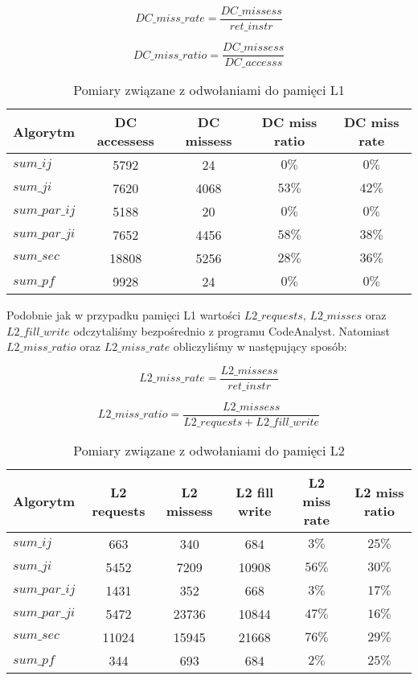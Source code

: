 \begin{equation}
  DC\_miss\_rate = \frac{DC\_missess}{ret\_instr}
\end{equation}

\begin{equation}
  DC\_miss\_ratio = \frac{DC\_missess}{DC\_accesss}
\end{equation}

\begin{table}[H]
\centering
\begin{tabular}{|l|c|c|c|c|}
\hline
Algorytm & DC accessess & DC missess & DC miss ratio & DC miss rate \\ \hline
$sum\_ij$ & 5792 & 24 & $0\%$ & $0\%$ \\ \hline
$sum\_ji$ & 7620 & 4068 & $53\%$ & $42\%$ \\ \hline
$sum\_par\_ij$ & 5188 & 20 & $0\%$ & $0\%$ \\ \hline
$sum\_par\_ji$ & 7652 & 4456 & $58\%$ & $38\%$ \\ \hline
$sum\_sec$ & 18808 & 5256 & $28\%$ & $36\%$ \\ \hline
$sum\_pf$ & 9928 & 24 & $0\%$ & $0\%$ \\ \hline
\end{tabular}
\caption{Pomiary związane z odwołaniami do pamięci L1}
\end{table}

Podobnie jak w przypadku pamięci L1 wartości $L2\_requests$, $L2\_misses$ oraz $L2\_fill\_write$ odczytaliśmy bezpośrednio z programu CodeAnalyst. Natomiast $L2\_miss\_ratio$ oraz $L2\_miss\_rate$ obliczyliśmy w następujący sposób:

\begin{equation}
  L2\_miss\_rate = \frac{L2\_missess}{ret\_instr}
\end{equation}

\begin{equation}
  L2\_miss\_ratio = \frac{L2\_missess}{L2\_requests + L2\_fill\_write}
\end{equation}

\begin{table}[H]
\centering
\begin{tabular}{|l|c|c|c|c|c|}
\hline
Algorytm & L2 requests & L2 missess & L2 fill write & L2 miss rate & L2 miss ratio \\ \hline
$sum\_ij$ & 663 & 340 & 684 & $3\%$ & $25\%$ \\ \hline
$sum\_ji$ & 5452 & 7209 & 10908 & $56\%$ & $30\%$ \\ \hline
$sum\_par\_ij$ & 1431 & 352 & 668 & $3\%$ & $17\%$ \\ \hline
$sum\_par\_ji$ & 5472 & 23736 & 10844 & $47\%$ & $16\%$ \\ \hline
$sum\_sec$ & 11024 & 15945 & 21668 & $76\%$ & $29\%$ \\ \hline
$sum\_pf$ & 344 & 693 & 684 & $2\%$ & $25\%$ \\ \hline
\end{tabular}
\caption{Pomiary związane z odwołaniami do pamięci L2}
\end{table}

